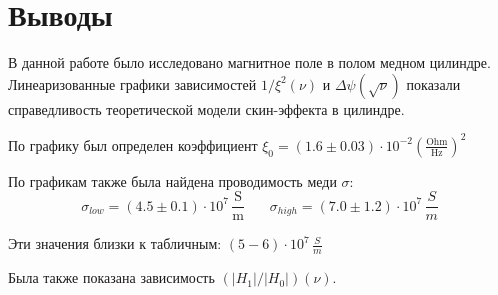 \documentclass[12pt,a4paper]{scrartcl}
\begin{document}
	
	
	\section{Выводы}
	
	В данной работе было исследовано магнитное поле в полом медном цилиндре. Линеаризованные графики зависимостей $1/\xi^2(\nu)$ и $\Delta \psi (\sqrt{\nu})$ показали справедливость теоретической модели скин-эффекта в цилиндре.
	
	По графику был определен коэффициент $\xi_0 = (1.6 \pm 0.03) \cdot 10^{-2} \left(\frac{\text{Ohm}}{\text{Hz}}\right)^2$
	
	По графикам также была найдена проводимость меди $\sigma$: 
	$$\sigma_{low} = (4.5 \pm 0.1) \cdot 10^7\,\frac{\text{S}}{\text{m}} \ \ \ \ \ \ \ \ \sigma_{high} = (7.0 \pm 1.2) \cdot 10^7\, \frac{S}{m}$$
	
	Эти значения близки к табличным: $(5 - 6) \cdot 10^7\, \frac{S}{m}$

	Была также показана зависимость $(|H_1|/|H_0|)(\nu)$.
	
\end{document}
